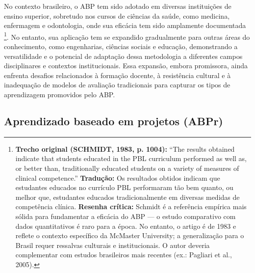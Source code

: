 No contexto brasileiro, o ABP tem sido adotado em diversas instituições de ensino superior, sobretudo nos cursos de ciências da saúde, como medicina, enfermagem e odontologia, onde sua eficácia tem sido amplamente documentada \cite{SCHMIDT1983}\footnote{\textbf{Trecho original (SCHMIDT, 1983, p. 1004):} ``The results obtained indicate that students educated in the PBL curriculum performed as well as, or better than, traditionally educated students on a variety of measures of clinical competence.'' \textbf{Tradução:} Os resultados obtidos indicam que estudantes educados no currículo PBL performaram tão bem quanto, ou melhor que, estudantes educados tradicionalmente em diversas medidas de competência clínica. \textbf{Resenha crítica:} Schmidt é a referência empírica mais sólida para fundamentar a eficácia do ABP — o estudo comparativo com dados quantitativos é raro para a época. No entanto, o artigo é de 1983 e reflete o contexto específico da McMaster University; a generalização para o Brasil requer ressalvas culturais e institucionais. O autor deveria complementar com estudos brasileiros mais recentes (ex.: Pagliari et al., 2005).}. No entanto, sua aplicação tem se expandido gradualmente para outras áreas do conhecimento, como engenharias, ciências sociais e educação, demonstrando a versatilidade e o potencial de adaptação dessa metodologia a diferentes campos disciplinares e contextos institucionais. Essa expansão, embora promissora, ainda enfrenta desafios relacionados à formação docente, à resistência cultural e à inadequação de modelos de avaliação tradicionais para capturar os tipos de aprendizagem promovidos pelo ABP.

\subsection{Aprendizado baseado em projetos (ABPr)}
\label{subsec:abpr_descricao}

